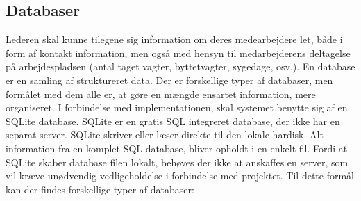 \subsection{Databaser}
Lederen skal kunne tilegene sig information om deres medearbejdere let, både i form af kontakt information, men også med hensyn til medarbejderens deltagelse på arbejdespladsen (antal taget vagter, byttetvagter, sygedage, osv.). En database er en samling af struktureret data. Der er forskellige typer af databaser, men formålet med dem alle er, at gøre en mængde ensartet information, mere organiseret. \citep{database} I forbindelse med implementationen,  skal systemet benytte sig af en SQLite database. SQLite er en gratis SQL integreret database, der ikke har en separat server. SQLite skriver eller læser direkte til den lokale hardisk. Alt information fra en komplet SQL database, bliver opholdt i en enkelt fil. \citep{SQLiteAbout} Fordi at SQLite skaber database filen lokalt, behøves der ikke at anskaffes en server, som vil kræve unødvendig vedligeholdelse i forbindelse med projektet. Til dette formål kan der findes forskellige typer af databaser:

